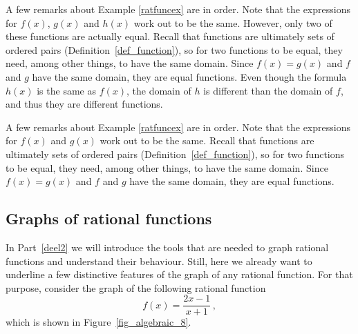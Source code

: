 \ifcourse
	\checkoddpage
{}
A few remarks about Example \ref{ratfuncex} are in order. Note that the expressions for $f(x)$, $g(x)$ and $h(x)$ work out to be the same.  However, only two of these functions are actually equal.  Recall that functions are ultimately sets of ordered pairs (Definition~\ref{def_function}), so for two functions to be equal, they need, among other things, to have the same domain.  Since $f(x) = g(x)$ and $f$ and $g$ have the same domain, they are equal functions.  Even though the formula $h(x)$ is the same as $f(x)$, the domain of $h$ is different than the domain of $f$, and thus they are different functions. 

\fi

\ifvc
	\checkoddpage
{}
A few remarks about Example \ref{ratfuncex} are in order. Note that the expressions for $f(x)$ and $g(x)$ work out to be the same.  Recall that functions are ultimately sets of ordered pairs (Definition~\ref{def_function}), so for two functions to be equal, they need, among other things, to have the same domain.  Since $f(x) = g(x)$ and $f$ and $g$ have the same domain, they are equal functions. 

\fi


\ifcourse

\subsection{Graphs of rational functions}
In Part~\ref{deel2} we will introduce the tools that are needed to graph rational functions and understand their behaviour. Still, here we already want to underline a few distinctive features of the graph of any rational function. For that purpose, consider the graph of the following rational function
\begin{equation}
\label{exratfun}
f(x)=\dfrac{2x-1}{x+1}\,,
\end{equation}
which is shown in Figure~\ref{fig_algebraic_8}.

